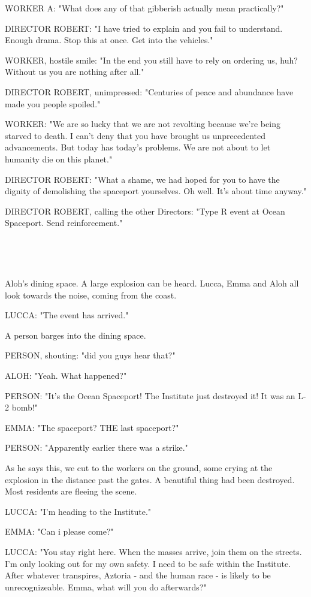\documentclass[11pt]{article}
\begin{document}
WORKER A: "What does any of that gibberish actually mean practically?"

DIRECTOR ROBERT: "I have tried to explain and you fail to understand.
Enough drama.
Stop this at once. 
Get into the vehicles."

WORKER, hostile smile: "In the end you still have to rely on ordering us, huh? 
Without us you are nothing after all."

DIRECTOR ROBERT, unimpressed: "Centuries of peace and abundance have made you people spoiled."

WORKER: "We are so lucky that we are not revolting because we're being starved to death.
I can't deny that you have brought us unprecedented advancements.
But today has today's problems.
We are not about to let humanity die on this planet."

DIRECTOR ROBERT: "What a shame, we had hoped for you to have the dignity of demolishing the spaceport yourselves. Oh well. 
It's about time anyway."

DIRECTOR ROBERT, calling the other Directors: "Type R event at Ocean Spaceport.
Send reinforcement."

\ 

\ 

Aloh's dining space.
A large explosion can be heard. 
Lucca, Emma and Aloh all look towards the noise, coming from the coast.

LUCCA: "The event has arrived."

A person barges into the dining space.

PERSON, shouting: "did you guys hear that?"

ALOH: "Yeah. What happened?"

PERSON: "It's the Ocean Spaceport! 
The Institute just destroyed it! 
It was an L-2 bomb!"

EMMA: "The spaceport? THE last spaceport?"

PERSON: "Apparently earlier there was a strike."

As he says this, we cut to the workers on the ground, some crying at the explosion in the distance past the gates.
A beautiful thing had been destroyed.
Most residents are fleeing the scene. 

LUCCA: "I'm heading to the Institute."

EMMA: "Can i please come?"

LUCCA: "You stay right here. When the masses arrive, join them on the streets. 
I'm only looking out for my own safety. I need to be safe within the Institute.
After whatever transpires, Aztoria - and the human race - is likely to be unrecognizeable.
Emma, what will you do afterwards?"
\end{document}
